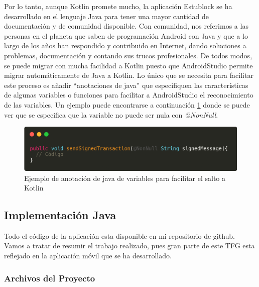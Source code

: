 Por lo tanto, aunque Kotlin promete mucho, la aplicación Estublock se ha desarrollado en el lenguaje Java para tener una mayor cantidad de documentación y de comunidad disponible. Con comunidad, nos referimos a las personas en el planeta que saben de programación Android con Java y que a lo largo de los años han respondido y contribuido en Internet, dando soluciones a problemas, documentación y contando sus trucos profesionales. De todos modos, se puede migrar con mucha facilidad a Kotlin puesto que AndroidStudio permite migrar automáticamente de Java a Kotlin. Lo único que se necesita para facilitar este proceso es añadir ``anotaciones de java'' que especifiquen las características de algunas variables o funciones para facilitar a AndroidStudio el reconocimiento de las variables. Un ejemplo puede encontrarse a continuación \ref{fig:nonNull} donde se puede ver que se especifica que la variable no puede ser nula con \emph{@NonNull}.


\begin{figure}[h!]
  \centering
  \includegraphics[width=0.9\linewidth]{figs/Desarrollo/nonNull}
  \caption[Facilitar el salto a Kotlin]{Ejemplo de anotación de java de variables para facilitar el salto a Kotlin}
  \label{fig:nonNull}
\end{figure}


\subsection{Implementación Java}

Todo el código de la aplicación esta disponible en mi repositorio de github\cite{forgis98}. Vamos a tratar de resumir el trabajo realizado, pues gran parte de este TFG esta reflejado en la aplicación móvil que se ha desarrollado.

\subsubsection{Archivos del Proyecto}


